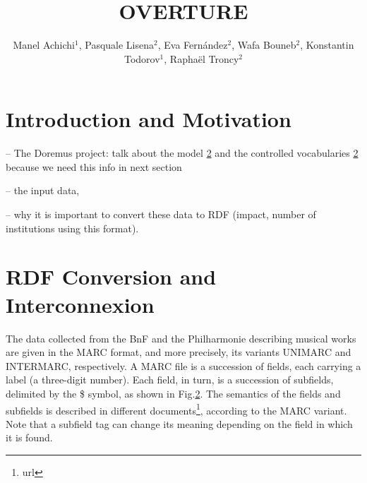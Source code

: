 \documentclass[runningheads,a4paper]{llncs}
\begin{document}
\title{OVERTURE}


\author{Manel Achichi$^1$, Pasquale Lisena$^2$, Eva Fern\'{a}ndez$^2$, Wafa Bouneb$^2$, Konstantin Todorov$^1$, Rapha\"{e}l Troncy$^2$}

\maketitle


\begin{abstract}

\end{abstract}


\section{Introduction and Motivation}

-- The Doremus project: talk about the model \ref{} and the controlled vocabularies \ref{} because we need this info in next section

-- the input data, 

-- why it is important to convert these data to RDF (impact, number of institutions using this format).


\section{RDF Conversion and Interconnexion}

The data collected from the BnF and the Philharmonie describing musical works are given in the MARC format, and more precisely, its variants UNIMARC and INTERMARC, respectively. A MARC file is a succession of fields, each carrying a label (a three-digit number). Each field, in turn, is a succession of subfields, delimited by the \$ symbol, as shown in Fig.\ref{}. The semantics of the fields and subfields is described in different documents\footnote{url}, according to the MARC variant. Note that a subfield tag can change its meaning depending on the field in which it is found. 
\end{document}
